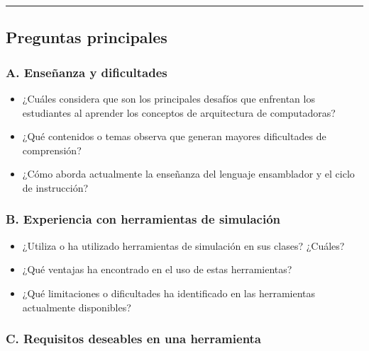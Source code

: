 \documentclass[12pt,oneside]{templates/unerthesis}
\providecommand{\tightlist}{%
  \setlength{\itemsep}{0pt}\setlength{\parskip}{0pt}}
\begin{document}
\begin{center}\rule{0.5\linewidth}{0.5pt}\end{center}

\hypertarget{preguntas-principales}{%
\subsection{Preguntas principales}\label{preguntas-principales}}

\hypertarget{a.-enseuxf1anza-y-dificultades}{%
\subsubsection{A. Enseñanza y dificultades}\label{a.-enseuxf1anza-y-dificultades}}

\begin{itemize}
\tightlist
\item
  ¿Cuáles considera que son los principales desafíos que enfrentan los estudiantes al aprender los conceptos de arquitectura de computadoras?
\item
  ¿Qué contenidos o temas observa que generan mayores dificultades de comprensión?
\item
  ¿Cómo aborda actualmente la enseñanza del lenguaje ensamblador y el ciclo de instrucción?
\end{itemize}

\hypertarget{b.-experiencia-con-herramientas-de-simulaciuxf3n}{%
\subsubsection{B. Experiencia con herramientas de simulación}\label{b.-experiencia-con-herramientas-de-simulaciuxf3n}}

\begin{itemize}
\tightlist
\item
  ¿Utiliza o ha utilizado herramientas de simulación en sus clases? ¿Cuáles?
\item
  ¿Qué ventajas ha encontrado en el uso de estas herramientas?
\item
  ¿Qué limitaciones o dificultades ha identificado en las herramientas actualmente disponibles?
\end{itemize}

\hypertarget{c.-requisitos-deseables-en-una-herramienta}{%
\subsubsection{C. Requisitos deseables en una herramienta}\label{c.-requisitos-deseables-en-una-herramienta}}
\end{document}
